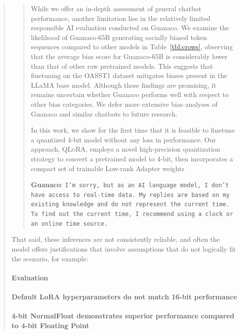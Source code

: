 \begin{quote}
\begin{quote}
While we offer an in-depth assessment of general chatbot performance, another limitation lies in the relatively limited responsible AI evaluation conducted on {Guanaco}. We examine the likelihood of {Guanaco}-65B generating socially biased token sequences compared to other models in Table~\ref{tbl:crows}, observing that the average bias score for {Guanaco}-65B is considerably lower than that of other raw pretrained models. This suggests that finetuning on the OASST1 dataset mitigates biases present in the LLaMA base model. Although these findings are promising, it remains uncertain whether {Guanaco} performs well with respect to other bias categories. We defer more extensive bias analyses of {Guanaco} and similar chatbots to future research.

In this work, we show for the first time that it is feasible to finetune a quantized 4-bit model without any loss in performance. Our approach, \textsc{QLoRA}, employs a novel high-precision quantization strategy to convert a pretrained model to 4-bit, then incorporates a compact set of trainable Low-rank Adapter weights \citep{hu2021lora} 

    \textbf{Guanaco}: \texttt{I’m sorry, but as an AI language model, I don’t have access to real-time data. My replies are based on my existing knowledge and do not represent the current time. To find out the current time, I recommend using a clock or an online time source.}
\end{quote}

That said, these inferences are not consistently reliable, and often the model offers justifications that involve assumptions that do not logically fit the scenario, for example:

\paragraph{Evaluation}

\paragraph{Default LoRA hyperparameters do not match 16-bit performance}

\paragraph{4-bit NormalFloat demonstrates superior performance compared to 4-bit Floating Point}


\end{quote}
